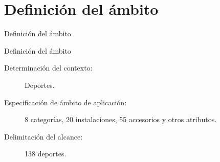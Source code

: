\section{Definición del ámbito}
\begin{frame}
\end{frame}

\begin{frame}{Definición del ámbito}
 \begin{block}{Definición del ámbito}
  \begin{description}
   \item [Determinación del contexto:] Deportes.
   \item [Especificación de ámbito de aplicación:] 8 categorías, 20 instalaciones, 55 accesorios y otros atributos.
   \item [Delimitación del alcance:] 138 deportes.
  \end{description}
 \end{block}
\end{frame}
